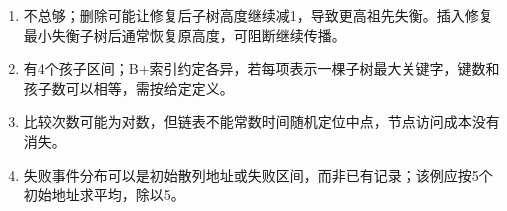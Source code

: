 \begin{enumerate}
\def\labelenumi{\arabic{enumi}.}
\setcounter{enumi}{4}
\tightlist
\item
  不总够；删除可能让修复后子树高度继续减1，导致更高祖先失衡。插入修复最小失衡子树后通常恢复原高度，可阻断继续传播。
\item
  有4个孩子区间；B+索引约定各异，若每项表示一棵子树最大关键字，键数和孩子数可以相等，需按给定定义。
\item
  比较次数可能为对数，但链表不能常数时间随机定位中点，节点访问成本没有消失。
\item
  失败事件分布可以是初始散列地址或失败区间，而非已有记录；该例应按5个初始地址求平均，除以5。
\end{enumerate}
